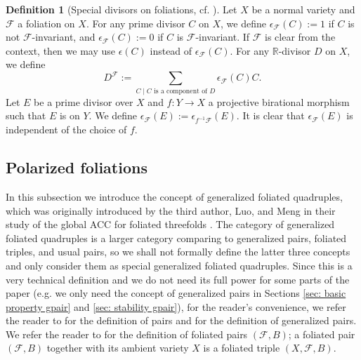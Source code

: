 \documentclass[11pt]{amsart}
\numberwithin{equation}{section}
\newcommand{\Rr}{\mathbb{R}}
\newcommand{\Ff}{\mathcal{F}}
\theoremstyle{definition}
\newtheorem{defn}[thm]{Definition}
\theoremstyle{definition}
\theoremstyle{definition}
\begin{document}
\begin{defn}[Special divisors on foliations, cf. {\cite[Definition 2.2]{CS21}}]\label{defn: special divisors on foliations}
Let $X$ be a normal variety and $\Ff$ a foliation on $X$. For any prime divisor $C$ on $X$, we define $\epsilon_{\Ff}(C):=1$ if $C$ is not $\Ff$-invariant, and  $\epsilon_{\Ff}(C):=0$ if $C$ is $\Ff$-invariant. If $\Ff$ is clear from the context, then we may use $\epsilon(C)$ instead of $\epsilon_{\Ff}(C)$. For any $\Rr$-divisor $D$ on $X$, we define $$D^{\Ff}:=\sum_{C\mid C\text{ is a component of }D}\epsilon_{\Ff}(C)C.$$
Let $E$ be a prime divisor over $X$ and $f: Y\rightarrow X$ a projective birational morphism such that $E$ is on $Y$. We define $\epsilon_{\Ff}(E):=\epsilon_{f^{-1}\Ff}(E)$. It is clear that $\epsilon_{\Ff}(E)$ is independent of the choice of $f$.
\end{defn}

\subsection{Polarized foliations} In this subsection we introduce the concept of generalized foliated quadruples, which was originally introduced by the third author, Luo, and Meng in their study of the global ACC for foliated threefolds \cite{LLM23}.  The category of generalized foliated quadruples is a larger category comparing to generalized pairs, foliated triples, and usual pairs, so we shall not formally define the latter three concepts and only consider them as special generalized foliated quadruples. Since this is a very technical definition and we do not need its full power for some parts of the paper (e.g. we only need the concept of generalized pairs in Sections \ref{sec: basic property gpair} and \ref{sec: stability gpair}), for the reader's convenience, we refer the reader to \cite{KM98,BCHM10} for the definition of pairs and \cite{BZ16,HL21a} for the definition of generalized pairs. We refer the reader to \cite{CS20,CS21} for the definition of foliated pairs $(\Ff,B)$; a foliated pair $(\Ff,B)$ together with its ambient variety $X$ is a foliated triple $(X,\Ff,B)$.
\end{document}
